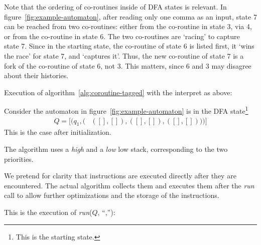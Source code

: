 \documentclass[11pt,a4paper,twoside,openright]{Thesis}
\theoremstyle{definition}
\newcommand{\str}[1]{``#1''}
\newcommand{\Figref}[1]{figure~\ref{fig:#1}}
\begin{document}
Note that the ordering of co-routines inside of DFA states is relevant.
In \Figref{example-automaton}, after reading only one comma as an
input, state 7 can be reached from two co-routines: either from the
co-routine in state 3, via 4, or from the co-routine in state 6. The two
co-routines are `racing' to capture state 7. Since in the starting
state, the co-routine of state 6 is listed first, it `wins the race'
for state 7, and `captures it'. Thus, the new co-routine of state 7 is
a fork of the co-routine of state 6, not 3. This matters, since 6 and
3 may disagree about their histories.

\begin{example} Execution of algorithm~\ref{alg:coroutine-tagged} with the
  interpret as above:

Consider the automaton in figure~\ref{fig:example-automaton} is in
the DFA state\footnote{This is the starting state.}
\begin{align*}
Q=[(q_1, (&([], []), ([], []), ([], [])))]
\end{align*}
This is the case after initialization.

The algorithm uses a \emph{high} and a \emph{low} low stack, corresponding to 
the two priorities.

We pretend for clarity that instructions are executed directly
after they are encountered.  The actual algorithm collects them and
executes them after the \emph{run} call to allow further
optimizations and the storage of the instructions.

This is the execution of \emph{run}($Q$, \str{,}):


\end{example}
\end{document}
